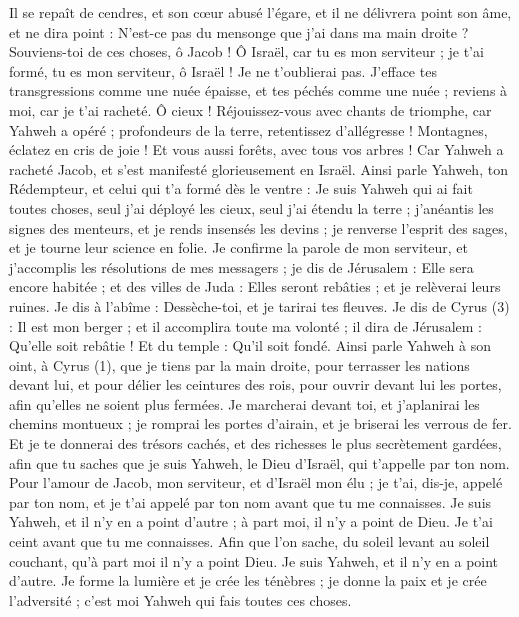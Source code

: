 \begin{multicols}{2}
Il se repaît de cendres, et son cœur abusé l’égare, et il ne délivrera point son âme, et ne dira point : N’est-ce pas du mensonge que j’ai dans ma main droite ?
Souviens-toi de ces choses, ô Jacob ! Ô Israël, car tu es mon serviteur ; je t'ai formé, tu es mon serviteur, ô Israël ! Je ne t’oublierai pas.
J'efface tes transgressions comme une nuée épaisse, et tes péchés comme une nuée ; reviens à moi, car je t'ai racheté.
Ô cieux ! Réjouissez-vous avec chants de triomphe, car Yahweh a opéré ; profondeurs de la terre, retentissez d’allégresse ! Montagnes, éclatez en cris de joie ! Et vous aussi forêts, avec tous vos arbres ! Car Yahweh a racheté Jacob, et s'est manifesté glorieusement en Israël.
Ainsi parle Yahweh, ton Rédempteur, et celui qui t'a formé dès le ventre : Je suis Yahweh qui ai fait toutes choses, seul j’ai déployé les cieux, seul j’ai étendu la terre ;
j’anéantis les signes des menteurs, et je rends insensés les devins ; je renverse l'esprit des sages, et je tourne leur science en folie.
Je confirme la parole de mon serviteur, et j’accomplis les résolutions de mes messagers ; je dis de Jérusalem : Elle sera encore habitée ; et des villes de Juda : Elles seront rebâties ; et je relèverai leurs ruines.
Je dis à l’abîme : Dessèche-toi, et je tarirai tes fleuves.
Je dis de Cyrus (3) : Il est mon berger ; et il accomplira toute ma volonté ; il dira de Jérusalem : Qu’elle soit rebâtie ! Et du temple : Qu’il soit fondé.
\VerseOne{}Ainsi parle Yahweh à son oint, à Cyrus (1),
que je tiens par la main droite, pour terrasser les nations devant lui, et pour délier les ceintures des rois, pour ouvrir devant lui les portes, afin qu’elles ne soient plus fermées.
Je marcherai devant toi, et j’aplanirai les chemins montueux ; je romprai les portes d'airain, et je briserai les verrous de fer. Et je te donnerai des trésors cachés, et des richesses le plus secrètement gardées, afin que tu saches que je suis Yahweh, le Dieu d'Israël, qui t'appelle par ton nom.
Pour l'amour de Jacob, mon serviteur, et d'Israël mon élu ; je t'ai, dis-je, appelé par ton nom, et je t'ai appelé par ton nom avant que tu me connaisses.
Je suis Yahweh, et il n'y en a point d'autre ; à part moi, il n'y a point de Dieu. Je t'ai ceint avant que tu me connaisses.
Afin que l’on sache, du soleil levant au soleil couchant, qu’à part moi il n'y a point Dieu. Je suis Yahweh, et il n'y en a point d'autre.
Je forme la lumière et je crée les ténèbres ; je donne la paix et je crée l'adversité ; c'est moi Yahweh qui fais toutes ces choses.

\end{multicols}
